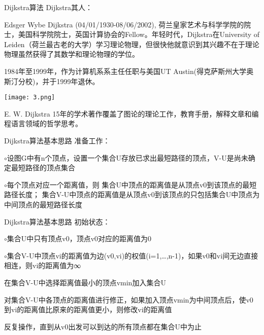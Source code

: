 \documentclass[12pt]{beamer}
\begin{document}
\begin{frame}[allowframebreaks]{Dijkstra算法}
Dijkstra其人：

Edsger Wybe Dijkstra (04/01/1930-08/06/2002),  荷兰皇家艺术与科学学院的院士，美国科学院院士，英国计算协会的Fellow。年轻时代，Dijkstra在University of Leiden（荷兰最古老的大学）学习理论物理，但很快他就意识到其兴趣不在于理论物理虽然获得了其数学和理论物理的学位。

1984年至1999年，作为计算机系系主任任职与美国UT Austin(得克萨斯州大学奥斯汀分校)，并于1999年退休。 
 
\texttt{[image: 3.png]}

E. W. Dijkstra 15年的学术著作覆盖了图论的理论工作，教育手册，解释文章和编程语言领域的哲学思考。

\end{frame}
\begin{frame}[allowframebreaks]{Dijkstra算法基本思路}
准备工作：

$\circ$设图G中有n个顶点，设置一个集合U存放已求出最短路径的顶点，V-U是尚未确定最短路径的顶点集合

$\circ$每个顶点对应一个距离值，则
集合U中顶点的距离值是从顶点v0到该顶点的最短路径长度；
集合V-U中顶点的距离值是从顶点v0到该顶点的只包括集合U中顶点为中间顶点的最短路径长度
\end{frame}
\begin{frame}[allowframebreaks]{Dijkstra算法基本思路}
初始状态：

$\circ$集合U中只有顶点v0，顶点v0对应的距离值为0

$\circ$集合V-U中顶点vi的距离值为边(v0,vi)的权值(i=1,…,n-1)，如果v0和vi间无边直接相连，则vi的距离值为∞

在集合V-U中选择距离值最小的顶点vmin加入集合U

对集合V-U中各顶点的距离值进行修正，如果加入顶点vmin为中间顶点后，使v0到vi的距离值比原来的距离值更小，则修改vi的距离值

反复操作，直到从v0出发可以到达的所有顶点都在集合U中为止


\end{frame}
\end{document}
